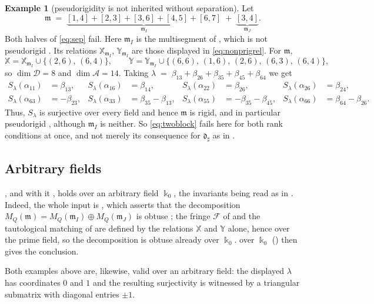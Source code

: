 \documentclass[12pt]{article}
\def\xspace{ }%
\theoremstyle{definition}
\newtheorem{example}[example]{Example}
\newcommand{\prig}{pseudorigid\xspace}
\newcommand{\prigity}{pseudorigidity\xspace}
\newcommand{\obt}{obtuse\xspace}
\newcommand{\mm}{\mathfrak{m}}
\newcommand{\kk}{\Bbbk}
\newcommand{\alg}{\mathcal{A}}   %
\newcommand{\bmdl}{\mathcal{D}}   %
\newcommand{\XX}{\mathbb{X}}  %
\newcommand{\YY}{\mathbb{Y}}  %
\newcommand{\algbss}{\alpha}     %
\newcommand{\bmdlbss}{\beta}    %
\newcommand{\Ff}{\mathcal{F}}   %
\newcommand{\dfr}{\mathfrak{d}}  %
\newcommand{\Sop}{S}
\newcommand{\rsub}{\sharp}       %
\newcommand{\psub}{\flat}        %
\begin{document}
\begin{example}[\prigity is not inherited without separation]\label{ex:notsepflat}
Let
\[
   \mm \;=\; \underbrace{[1,4]+[2,3]+[3,6]+[4,5]+[6,7]}_{\textstyle \mm_I}
   \;+\; \underbrace{[3,4]}_{\textstyle \mm_J} .
\]
Both halves of \eqref{eq:sep} fail.
Here $\mm_I$ is the multisegment of , which is not \prig. Its relations
$\XX_{\mm_I}$, $\YY_{\mm_I}$ are those displayed in \eqref{eq:nonprigrel}. For $\mm$,
\[
   \XX = \XX_{\mm_I}\cup\{(2,6),\,(6,4)\}, \qquad
   \YY = \YY_{\mm_I}\cup\{(6,6),\,(1,6),\,(2,6),\,(6,3),\,(6,4)\} ,
\]
so $\dim\bmdl = 8$ and $\dim\alg = 14$. Taking $\lambda \;=\; \bmdlbss_{13}+\bmdlbss_{26}+\bmdlbss_{35}+\bmdlbss_{45}+\bmdlbss_{64}$ we get
\begin{align*}
   \Sop_\lambda(\algbss_{11}) &= \bmdlbss_{13}, &
   \Sop_\lambda(\algbss_{16}) &= \bmdlbss_{14}, &
   \Sop_\lambda(\algbss_{22}) &= \bmdlbss_{26}, &
   \Sop_\lambda(\algbss_{26}) &= \bmdlbss_{24},\\
   \Sop_\lambda(\algbss_{63}) &= -\bmdlbss_{23}, &
   \Sop_\lambda(\algbss_{33}) &= \bmdlbss_{35}-\bmdlbss_{13}, &
   \Sop_\lambda(\algbss_{55}) &= -\bmdlbss_{35}-\bmdlbss_{45}, &
   \Sop_\lambda(\algbss_{66}) &= \bmdlbss_{64}-\bmdlbss_{26}.
\end{align*}
Thus, $\Sop_\lambda$ is surjective over every field and hence $\mm$ is rigid, and in particular \prig,
although $\mm_I$ is neither. So \eqref{eq:twoblock} fails here for both rank
conditions at once, and not merely its consequence for $\dfr_\rsub$ as in
.
\end{example}

\subsection{Arbitrary fields}\label{ssec:arbesi}

, and with it , holds over an arbitrary field
$\kk_0$, the invariants being read as in . Indeed, the
whole input is , which asserts that the decomposition
$M_Q(\mm) = M_Q(\mm_I)\oplus M_Q(\mm_J)$ is \obt; the fringe $\Ff$ of
 and the tautological matching of  are defined
by the relations $\XX$ and $\YY$ alone, hence over the prime field, so the
decomposition is \obt already over $\kk_0$.  over $\kk_0$
() then gives the conclusion.

Both examples above are, likewise, valid over an arbitrary field: the
displayed $\lambda$ has coordinates $0$ and $1$ and the resulting
surjectivity is witnessed by a triangular submatrix with diagonal entries
$\pm1$.
\end{document}
